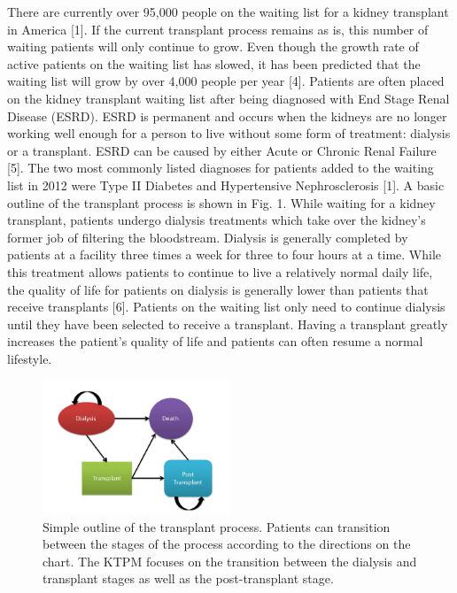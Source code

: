 \documentclass[9pt,a4paper,twocolumn]{scrartcl}
\begin{document}
There are currently over 95,000 people on the waiting list for a kidney transplant in America [1].  If the current transplant process remains as is, this number of waiting patients will only continue to grow.  Even though the growth rate of active patients on the waiting list has slowed, it has been predicted that the waiting list will grow by over 4,000 people per year [4].
Patients are often placed on the kidney transplant waiting list after being diagnosed with End Stage Renal Disease (ESRD).  ESRD is permanent and occurs when the kidneys are no longer working well enough for a person to live without some form of treatment: dialysis or a transplant.  ESRD can be caused by either Acute or Chronic Renal Failure [5].  The two most commonly listed diagnoses for patients added to the waiting list in 2012 were Type II Diabetes and Hypertensive Nephrosclerosis [1].  A basic outline of the transplant process is shown in Fig. 1.
While waiting for a kidney transplant, patients undergo dialysis treatments which take over the kidney’s former job of filtering the bloodstream.  Dialysis is generally completed by patients at a facility three times a week for three to four hours at a time.  While this treatment allows patients to continue to live a relatively normal daily life, the quality of life for patients on dialysis is generally lower than patients that receive transplants [6].
Patients on the waiting list only need to continue dialysis until they have been selected to receive a transplant.  Having a transplant greatly increases the patient’s quality of life and patients can often resume a normal lifestyle.

\begin{figure}[h!]
  \caption{Simple outline of the transplant process.  Patients can transition between the stages of the process according to the directions on the chart.  The KTPM focuses on the transition between the dialysis and transplant stages as well as the post-transplant stage.}
  \centering
    \includegraphics[width=0.5\textwidth]{Fig1}
\end{figure}
\end{document}
